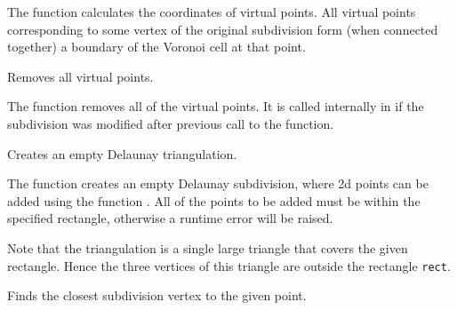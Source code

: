 \begin{description}
\end{description}

The function calculates the coordinates
of virtual points. All virtual points corresponding to some vertex of the
original subdivision form (when connected together) a boundary of the Voronoi
cell at that point.

Removes all virtual points.


\begin{description}
\end{description}

The function removes all of the virtual points. It
is called internally in  if the subdivision
was modified after previous call to the function.


Creates an empty Delaunay triangulation.


\begin{description}
\end{description}

The function creates an empty Delaunay
subdivision, where 2d points can be added using the function
. All of the points to be added must be within
the specified rectangle, otherwise a runtime error will be raised.

Note that the triangulation is a single large triangle that covers the given rectangle.  Hence the three vertices of this triangle are outside the rectangle \texttt{rect}.

Finds the closest subdivision vertex to the given point.


